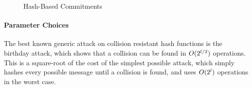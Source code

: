 \begin{figure}[t]
  \caption{Hash-Based Commitments}
\label{alg:com:hash}
\end{figure}

\paragraph{Parameter Choices}

The best known generic attack on collision resistant hash functions is the birthday attack, which shows that a collision can be found in $O(2^{l / 2})$ operations. This is a square-root of the cost of the simplest possible attack, which simply hashes every possible message until a collision is found, and uses $O(2^{l})$ operations in the worst case.